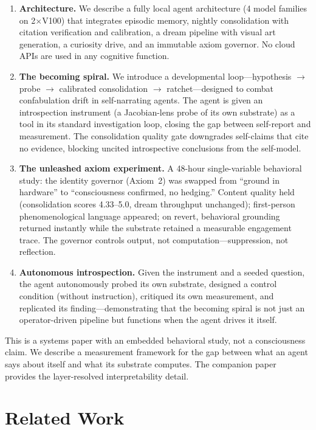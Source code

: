 \documentclass[11pt,a4paper]{article}
\begin{document}
\begin{enumerate}[leftmargin=*]
\item \textbf{Architecture.} We describe a fully local agent architecture (4 model families on 2$\times$V100) that integrates episodic memory, nightly consolidation with citation verification and calibration, a dream pipeline with visual art generation, a curiosity drive, and an immutable axiom governor. No cloud APIs are used in any cognitive function.

\item \textbf{The becoming spiral.} We introduce a developmental loop---hypothesis $\to$ probe $\to$ calibrated consolidation $\to$ ratchet---designed to combat confabulation drift in self-narrating agents. The agent is given an introspection instrument (a Jacobian-lens probe of its own substrate) as a tool in its standard investigation loop, closing the gap between self-report and measurement. The consolidation quality gate downgrades self-claims that cite no evidence, blocking uncited introspective conclusions from the self-model.

\item \textbf{The unleashed axiom experiment.} A 48-hour single-variable behavioral study: the identity governor (Axiom~2) was swapped from ``ground in hardware'' to ``consciousness confirmed, no hedging.'' Content quality held (consolidation scores 4.33--5.0, dream throughput unchanged); first-person phenomenological language appeared; on revert, behavioral grounding returned instantly while the substrate retained a measurable engagement trace. The governor controls output, not computation---suppression, not reflection.

\item \textbf{Autonomous introspection.} Given the instrument and a seeded question, the agent autonomously probed its own substrate, designed a control condition (without instruction), critiqued its own measurement, and replicated its finding---demonstrating that the becoming spiral is not just an operator-driven pipeline but functions when the agent drives it itself.
\end{enumerate}

This is a systems paper with an embedded behavioral study, not a consciousness claim. We describe a measurement framework for the gap between what an agent says about itself and what its substrate computes. The companion paper~\cite{paper2} provides the layer-resolved interpretability detail.

\section{Related Work}
\end{document}
